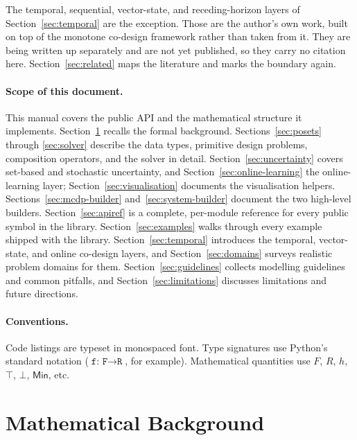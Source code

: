 \documentclass[11pt,a4paper]{article}
\newcommand{\Min}{\mathsf{Min}}
\begin{document}
The temporal, sequential, vector-state, and receding-horizon layers of
Section~\ref{sec:temporal} are the exception. Those are the author's own
work, built on top of the monotone co-design framework rather than taken
from it. They are being written up separately and are not yet published,
so they carry no citation here. Section~\ref{sec:related} maps the
literature and marks the boundary again.

\paragraph{Scope of this document.} This manual covers the public API
and the mathematical structure it implements. Section~\ref{sec:theory}
recalls the formal background. Sections~\ref{sec:posets} through
\ref{sec:solver} describe the data types, primitive design problems,
composition operators, and the solver in detail. Section~\ref{sec:uncertainty}
covers set-based and stochastic uncertainty, and
Section~\ref{sec:online-learning} the online-learning layer;
Section~\ref{sec:visualisation} documents the visualisation helpers.
Sections~\ref{sec:mcdp-builder} and~\ref{sec:system-builder} document the
two high-level builders. Section~\ref{sec:apiref} is a complete,
per-module reference for every public symbol in the library.
Section~\ref{sec:examples} walks through every
example shipped with the library. Section~\ref{sec:temporal} introduces
the temporal, vector-state, and online co-design layers, and
Section~\ref{sec:domains} surveys realistic problem domains for them.
Section~\ref{sec:guidelines} collects modelling guidelines and common
pitfalls, and Section~\ref{sec:limitations} discusses limitations and
future directions.

\paragraph{Conventions.} Code listings are typeset in monospaced font.
Type signatures use Python's standard notation
($\texttt{f: F} \rightarrow \texttt{R}$, for example). Mathematical
quantities use $F$, $R$, $h$, $\top$, $\bot$, $\Min$, etc.

\section{Mathematical Background}
\label{sec:theory}
\end{document}
